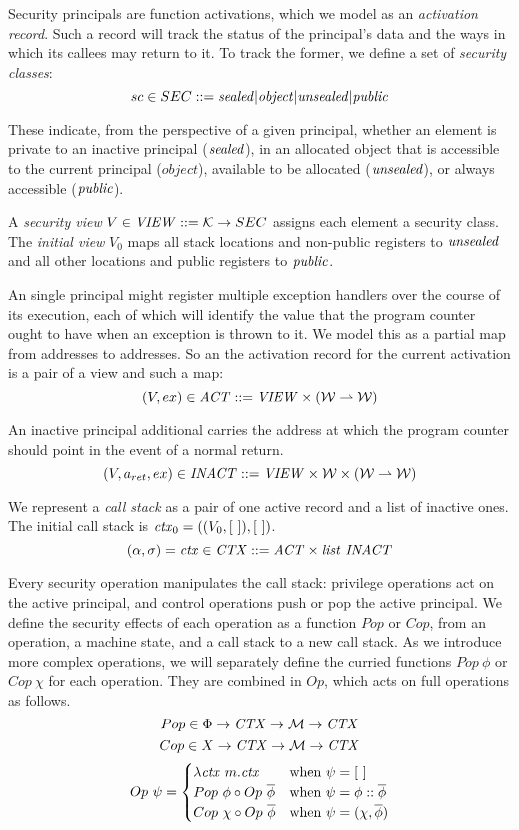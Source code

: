 \documentclass[10pt,conference]{ieeetran}%
\theoremstyle{definition}
\begin{document}
Security principals are function activations, which we model as an {\em activation record}.
Such a record will track the status of the principal's data and the ways in which its callees
may return to it. To track the former, we define a set of {\it security classes}:
\[sc \in SEC ::= \mathit{sealed} | \mathit{object} | \mathit{unsealed} | \mathit{public}\]

These indicate, from the perspective of a given principal, whether an element is
private to an inactive principal (\(\mathit{sealed}\)),
in an allocated object that is accessible to the current principal (\(\mathit{object}\)),
available to be allocated (\(\mathit{unsealed}\)), or
always accessible (\(\mathit{public}\)).

A {\it security view} \(V \in \mathit{VIEW} ::= {\mathcal K} \rightarrow SEC\)
assigns each element a security class.
The {\it initial view} \(V_0\) maps all stack locations and non-public registers
to \(\mathit{unsealed}\) and all other locations and public registers to \(\mathit{public}\).

An single principal might register multiple exception handlers over the
course of its execution, each of which will identify the value that the
program counter ought to have when an exception is thrown to it. We model
this as a partial map from addresses to addresses.
So an the activation record for the current activation is a pair of a view
and such a map:
\[(V,ex) \in \mathit{ACT} ::= \mathit{VIEW \times ({\mathcal W} \rightharpoonup {\mathcal W})}\]

An inactive principal additional carries the address at which the program counter
should point in the event of a normal return.
\[(V, a_{ret}, ex) \in \mathit{INACT} ::= \mathit{VIEW \times {\mathcal W} \times ({\mathcal W} \rightharpoonup {\mathcal W})}\]

We represent a {\it call stack} as a pair of one active record and a list of inactive ones.
The initial call stack is \(\mathit{ctx}_0 = ((V_0,[ ~ ]), [ ~ ])\).
\[(\alpha, \sigma) = \mathit{ctx} \in \mathit{CTX} ::= \mathit{ACT \times list ~ INACT}\]

Every security operation manipulates the call stack: privilege operations act on
the active principal, and control operations push or pop the active principal.
We define the security effects of each operation as a function \(Pop\) or \(Cop\),
from an operation, a machine state, and a call stack to a new call stack.
As we introduce more complex operations, we will separately define
the curried functions \(Pop ~ \phi\) or \(Cop ~ \chi\) for each operation.
They are combined in \(Op\), which acts on full operations as follows.
\[Pop \in \Phi \rightarrow \mathit{CTX} \rightarrow {\mathcal M} \rightarrow \mathit{CTX}\]
\[Cop \in X \rightarrow \mathit{CTX} \rightarrow {\mathcal M} \rightarrow \mathit{CTX}\]
\[Op ~ \psi =
\begin{cases}
  \lambda \mathit{ctx} ~ m . \mathit{ctx} & \textnormal{when } \psi = [~] \\
  Pop ~ \phi \circ Op ~ \overline{\phi} & \textnormal{when } \psi = \phi::\overline{\phi} \\
  Cop ~ \chi \circ Op ~ \overline{\phi} & \textnormal{when } \psi = (\chi,\overline{\phi}) \\
\end{cases}\]
         
\end{document}
